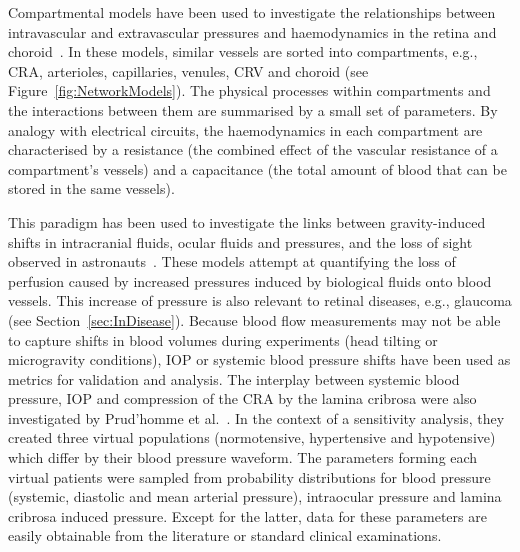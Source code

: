 \documentclass{article}
\begin{document}
Compartmental models have been used to investigate the relationships between intravascular and extravascular pressures and haemodynamics in the retina and choroid~\cite{Chiaravalli_2021,Fawzi_2019,Guidoboni_2014a, Nelson_2017,Petersen_2022,Prudhomme_2021,Sala_2020,Salerni_2019}.
In these models, similar vessels are sorted into compartments, e.g., CRA, arterioles, capillaries, venules, CRV and choroid (see Figure~\ref{fig:NetworkModels}).
The physical processes within compartments and the interactions between them are summarised by a small set of parameters.
By analogy with electrical circuits, the haemodynamics in each compartment are characterised by a resistance (the combined effect of the vascular resistance of a compartment's vessels) and a capacitance (the total amount of blood that can be stored in the same vessels).

This paradigm has been used to investigate the links between gravity-induced shifts in intracranial fluids, ocular fluids and pressures, and the loss of sight observed in astronauts~\cite{Nelson_2017,Petersen_2022,Salerni_2019}.
These models attempt at quantifying the loss of perfusion caused by increased pressures induced by biological fluids onto blood vessels.
This increase of pressure is also relevant to retinal diseases, e.g., glaucoma (see Section~\ref{sec:InDisease}).
Because blood flow measurements may not be able to capture shifts in blood volumes during experiments (head tilting or microgravity conditions), IOP or systemic blood pressure shifts have been used as metrics for validation and analysis.
The interplay between systemic blood pressure, IOP and compression of the CRA by the lamina cribrosa were also investigated by Prud'homme et al.~\cite{Prudhomme_2021}.
In the context of a sensitivity analysis, they created three virtual populations (normotensive, hypertensive and hypotensive) which differ by their blood pressure waveform.
The parameters forming each virtual patients were sampled from probability distributions for blood pressure (systemic, diastolic and mean arterial pressure), intraocular pressure and lamina cribrosa induced pressure.
Except for the latter, data for these parameters are easily obtainable from the literature or standard clinical examinations.
\end{document}
